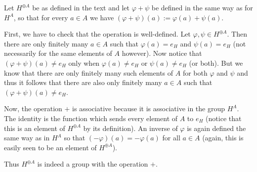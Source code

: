 \begin{problem}
\end{problem}

\begin{solution}
	Let $H^{\oplus A}$ be as defined in the text and let $\varphi + \psi$ be defined in the same way as for $H^A$, so that for every $a \in A$ we have $(\varphi + \psi)(a) := \varphi(a) + \psi(a)$. 
	
	First, we have to check that the operation is well-defined. Let $\varphi, \psi \in H^{\oplus A}$. Then there are only finitely many $a \in A$ such that $\varphi(a) = e_H$ and $\psi(a) = e_H$ (not necessarily for the same elements of $A$ however). Now notice that $(\varphi + \psi)(a) \neq e_H$ only when $\varphi(a) \neq e_H$ or $\psi(a) \neq e_H$ (or both). But we know that there are only finitely many such elements of $A$ for both $\varphi$ and $\psi$ and thus it follows that there are also only finitely many $a \in A$ such that $(\varphi + \psi)(a) \neq e_H$.
	
	Now, the operation $+$ is associative because it is associative in the group $H^A$. The identity is the function which sends every element of $A$ to $e_H$ (notice that this is an element of $H^{\oplus A}$ by its definition). An inverse of $\varphi$ is again defined the same way as in $H^A$ so that $(-\varphi)(a) = -\varphi(a)$ for all $a \in A$ (again, this is easily seen to be an element of $H^{\oplus A}$).
	
	Thus $H^{\oplus A}$ is indeed a group with the operation $+$.
\end{solution}

\begin{problem}
\end{problem}

